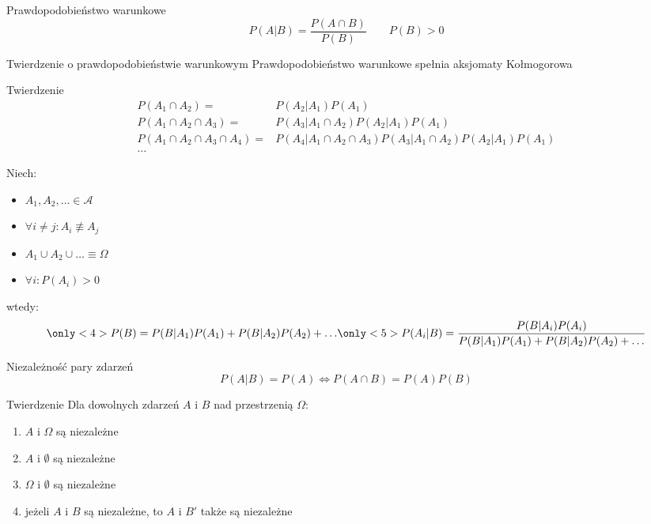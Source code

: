 \documentclass{mp}
\begin{document}
\begin{frame}{Prawdopodobieństwo warunkowe}
\[ P(A|B)=\frac{P(A\cap B)}{P(B)} \qquad P(B)>0 \]
{
\begin{block}{Twierdzenie o prawdopodobieństwie warunkowym}
Prawdopodobieństwo warunkowe spełnia aksjomaty Kołmogorowa
\end{block}
}
{
	\begin{block}{Twierdzenie}
	\begin{align*}
		P(A_1 \cap A_2)= & P(A_2|A_1)P(A_1) \\
		P(A_1 \cap A_2 \cap A_3)=& P(A_3|A_1\cap A_2)P(A_2|A_1)P(A_1) \\
		P(A_1 \cap A_2 \cap A_3\cap A_4)=& P(A_4|A_1\cap A_2\cap A_3) P(A_3|A_1\cap A_2)P(A_2|A_1)P(A_1) \\
		\ldots
	\end{align*}
	\end{block}
}
{
\begin{block}{}
Niech:
\begin{itemize}
\item $A_1, A_2, \ldots \in \mathcal{A}$
\item $\forall i\neq j\colon A_i\not\equiv A_j$
\item $A_1\cup A_2\cup \ldots \equiv \Omega$
\item $\forall i\colon P(A_i)>0$
\end{itemize}
wtedy:
\[
\only<4>{P(B)=P(B|A_1)P(A_1)+P(B|A_2)P(A_2)+\ldots}
\only<5>{P(A_i|B)=\frac{P(B|A_i)P(A_i)}{P(B|A_1)P(A_1)+P(B|A_2)P(A_2)+\ldots}}
\]
\end{block}
}
\end{frame}
\begin{frame}{Niezależność pary zdarzeń}
\[ P(A|B)=P(A) \iff P(A\cap B)=P(A)P(B) \]
{
\begin{block}{Twierdzenie}
Dla dowolnych zdarzeń $A$ i $B$ nad przestrzenią $\Omega$:
\begin{enumerate}
\item $A$ i $\Omega$ są niezależne
\item $A$ i $\emptyset$ są niezależne
\item $\Omega$ i $\emptyset$ są niezależne
\item jeżeli $A$ i $B$ są niezależne, to $A$ i $B'$ także są niezależne
\end{enumerate}
\end{block}
}
\end{frame}
\end{document}
